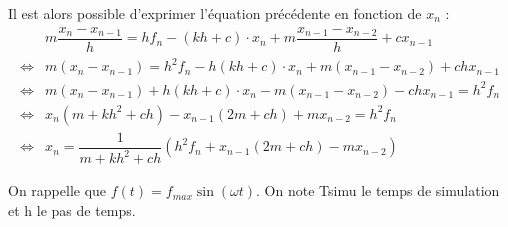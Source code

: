 \documentclass[10pt,fleqn]{article} %
\begin{document}
Il est alors possible d'exprimer l'équation précédente en fonction de $x_n$ :
%
%
%
%
$$
\begin{array}{cl}
&m\dfrac{x_{n}-x_{n-1}}{h}  = hf_n -  (kh+c) \cdot x_n + m\dfrac{x_{n-1}-x_{n-2}}{h}+cx_{n-1} \\
\Longleftrightarrow& 
m(x_{n}-x_{n-1}) = h^2f_n -  h(kh+c) \cdot x_n + m(x_{n-1}-x_{n-2})+chx_{n-1} \\
\Longleftrightarrow& 
m(x_{n}-x_{n-1}) +  h(kh+c) \cdot x_n - m(x_{n-1}-x_{n-2})-chx_{n-1} = h^2f_n \\
\Longleftrightarrow &
x_{n}\left(m +kh^2+ch\right)-x_{n-1}(2m+ch) +mx_{n-2} = h^2f_n  \\
\Longleftrightarrow &
x_{n}= \dfrac{1}{m +kh^2+ch} \left(h^2f_n +x_{n-1}(2m+ch) -mx_{n-2} \right)
\end{array}
$$


\ifprof
\else

\vspace{.5cm}

On rappelle que $f(t)=f_{max} \sin \left(\omega t\right)$. On note \textsf{Tsimu} le temps de simulation et \textsf{h} le pas de temps. 

\fi
\end{document}
